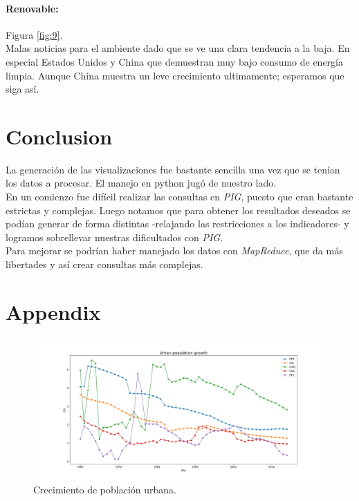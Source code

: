 \documentclass{article}
\begin{document}
\paragraph{Renovable:}
Figura \ref{fig:9}.\\
Malas noticias para el ambiente dado que se ve una clara tendencia a la baja. En especial Estados Unidos y China que demuestran muy bajo consumo de energía limpia. Aunque China muestra un leve crecimiento ultimamente; esperamos que siga así.

\section{Conclusion}

La generación de las visualizaciones fue bastante sencilla una vez que se tenían los datos a procesar. El manejo en python jugó de nuestro lado.\\
En un comienzo fue difícil realizar las consultas en \textit{PIG}, puesto que eran bastante estrictas y complejas. Luego notamos que para obtener los resultados deseados se podían generar de forma distintas -relajando las restricciones a los indicadores- y logramos sobrellevar nuestras dificultados con \textit{PIG}.\\
Para mejorar se podrían haber manejado los datos con \textit{MapReduce}, que da más libertades y así crear consultas más complejas.

\newpage
\section*{Appendix}



\begin{figure}[!h]
	\centering
	\includegraphics[scale=0.38]{images/2.png}
	\caption{Crecimiento de población urbana.}
	\label{fig:1}
\end{figure}
\end{document}
